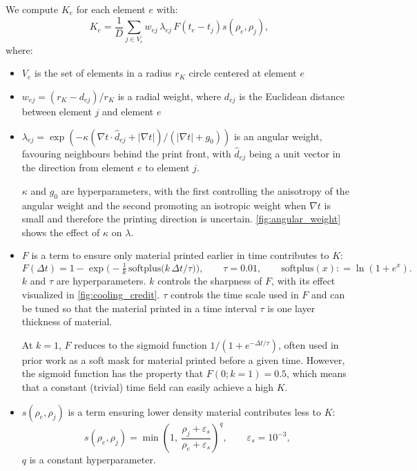 \documentclass{article}
\newcommand{\defeq}{\mathrel{\mathop:}=}
\begin{document}
We compute $K_e$ for each element $e$ with:
\[
    K_e = \frac{1}{D}\sum_{j \in V_e} w_{ej}\,\lambda_{ej}\, F(t_e - t_j)s(\rho_e, \rho_j),
\]
where:
\begin{itemize}
    \item $V_e$ is the set of elements in a radius $r_K$ circle centered at element $e$
    \item $w_{ej} = (r_K - d_{ej})/r_K$ is a radial weight, where $d_{ej}$ is the Euclidean distance between element $j$ and element $e$
    \item $\lambda_{ej} = \exp\left(-\kappa (\nabla t \cdot \hat d_{ej} + |\nabla t|)/(|\nabla t| + g_0)\right)$ is an angular weight, favouring neighbours behind the print front, with $\hat d_{ej}$ being a unit vector in the direction from element $e$ to element $j$.

          $\kappa$ and $g_0$ are hyperparameters, with the first controlling the anisotropy of the angular weight and the second promoting an isotropic weight when $\nabla t$ is small and therefore the printing direction is uncertain. \autoref{fig:angular_weight} shows the effect of $\kappa$ on $\lambda$.
    \item $F$ is a term to ensure only material printed earlier in time contributes to $K$:
          \[
              F(\Delta t) = 1 - \exp\!\Big(-\tfrac{1}{k}\,\mathrm{softplus}\big(k\,\Delta t/\tau\big)\Big), \qquad \tau = 0.01, \qquad \mathrm{softplus}(x) \defeq \ln \left(1 + e^x\right) .
          \]
          $k$ and $\tau$ are hyperparameters. $k$ controls the sharpness of $F$, with its effect visualized in \autoref{fig:cooling_credit}. $\tau$ controls the time scale used in $F$ and can be tuned so that the material printed in a time interval $\tau$ is one layer thickness of material.

          At $k=1$, $F$ reduces to the sigmoid function $1/\left(1 + e^{-\Delta t/\tau}\right)$, often used in prior work as a soft mask for material printed before a given time. However, the sigmoid function has the property that $F(0; k=1) = 0.5$, which means that a constant (trivial) time field can easily achieve a high $K$.

    \item $s(\rho_e, \rho_j)$ is a term ensuring lower density material contributes less to $K$:
          \[
              s(\rho_e, \rho_j) = \min\!\left(1,\ \frac{\rho_j + \varepsilon_s}{\rho_e + \varepsilon_s}\right)^{q}, \qquad \varepsilon_s = 10^{-3},
          \]
          $q$ is a constant hyperparameter.


\end{itemize}
\end{document}
